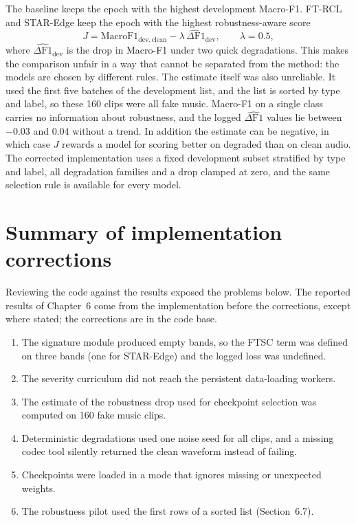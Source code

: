 \documentclass[12pt,a4paper]{report}
\begin{document}
The baseline keeps the epoch with the highest development Macro-F1. FT-RCL and STAR-Edge keep the epoch with the highest robustness-aware score
\begin{equation}
J = \mathrm{MacroF1}_{\mathrm{dev,clean}} - \lambda\,\widehat{\Delta \mathrm{F1}}_{\mathrm{dev}}, \qquad \lambda = 0.5 ,
\label{eq:jscore}
\end{equation}
where $\widehat{\Delta \mathrm{F1}}_{\mathrm{dev}}$ is the drop in Macro-F1 under two quick degradations. This makes the comparison unfair in a way that cannot be separated from the method: the models are chosen by different rules. The estimate itself was also unreliable. It used the first five batches of the development list, and the list is sorted by type and label, so these 160 clips were all fake music. Macro-F1 on a single class carries no information about robustness, and the logged $\widehat{\Delta \mathrm{F1}}$ values lie between $-0.03$ and $0.04$ without a trend. In addition the estimate can be negative, in which case $J$ rewards a model for scoring better on degraded than on clean audio. The corrected implementation uses a fixed development subset stratified by type and label, all degradation families and a drop clamped at zero, and the same selection rule is available for every model.

\section{Summary of implementation corrections}
\label{sec:audit}

Reviewing the code against the results exposed the problems below. The reported results of Chapter~6 come from the implementation before the corrections, except where stated; the corrections are in the code base.

\begin{enumerate}
  \item The signature module produced empty bands, so the FTSC term was defined on three bands (one for STAR-Edge) and the logged loss was undefined.
  \item The severity curriculum did not reach the persistent data-loading workers.
  \item The estimate of the robustness drop used for checkpoint selection was computed on 160 fake music clips.
  \item Deterministic degradations used one noise seed for all clips, and a missing codec tool silently returned the clean waveform instead of failing.
  \item Checkpoints were loaded in a mode that ignores missing or unexpected weights.
  \item The robustness pilot used the first rows of a sorted list (Section~6.7).
\end{enumerate}
\end{document}
